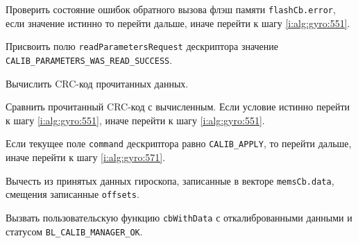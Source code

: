 \begin{enumerate_step}
    \item Проверить состояние ошибок обратного вызова флэш памяти \lstinline|flashCb.error|, если значение истинно то перейти дальше, иначе перейти к шагу \ref{i:alg:gyro:551}.
    \item Присвоить полю \lstinline|readParametersRequest| дескриптора значение \lstinline|CALIB_PARAMETERS_WAS_READ_SUCCESS|.
    \item Вычислить CRC-код прочитанных данных.
    \item Сравнить прочитанный CRC-код с вычисленным. Если условие истинно перейти к шагу \ref{i:alg:gyro:551}, иначе перейти к шагу \ref{i:alg:gyro:551}.
    
    \item \label{i:alg:gyro:566} Если текущее поле \lstinline|command| дескриптора равно \lstinline|CALIB_APPLY|, то перейти дальше, иначе перейти к шагу
    \ref{i:alg:gyro:571}.
    \item Вычесть из принятых данных гироскопа, записанные в векторе \lstinline|memsCb.data|, смещения записанные \lstinline|offsets|.
    \item Вызвать пользовательскую функцию \lstinline|cbWithData| с откалиброванными данными и статусом \lstinline|BL_CALIB_MANAGER_OK|.


\end{enumerate_step}
